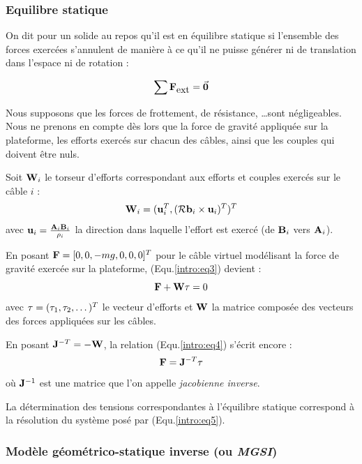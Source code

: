 \subsubsection{Equilibre statique}

On dit pour un solide au repos qu'il est en équilibre statique si l'ensemble des forces exercées s'annulent de manière à ce qu'il ne puisse générer ni de translation dans l'espace ni de rotation :

\begin{equation}
\sum \mathcal {\bf F}_{\hbox{ext}} = \vec {\bf 0}
\label{intro:eq2}
\end{equation}

Nous supposons que les forces de frottement, de résistance, \dots sont négligeables. Nous ne prenons en compte dès lors que la force de gravité appliquée sur la plateforme, les efforts exercés sur chacun des câbles, ainsi que les couples qui doivent être nuls.

Soit ${\bf W}_i$ le torseur d'efforts correspondant aux efforts et couples exercés sur le câble $i$ :
\begin{equation}
{\bf W}_i = ({\bf u}_i^T, (\mathcal R {\bf b}_i \times {\bf u}_i)^T)^T
\label{intro:eq3}
\end{equation}
avec ${\bf u}_i = \frac{{\bf A}_i{\bf B}_i}{\rho_i}$ la direction dans laquelle l'effort est exercé (de ${\bf B}_i$ vers ${\bf A}_i$).

En posant $\mathcal {\bf F} = [0, 0, -mg, 0, 0, 0]^T$ pour le câble virtuel modélisant la force de gravité exercée sur la plateforme, (Equ.\ref{intro:eq3}) devient :
\begin{equation}
\mathcal {\bf F} + {\bf W} {\bf \tau} = 0
\label{intro:eq4}
\end{equation}
avec ${\bf \tau} = (\tau_1, \tau_2, \dots)^T$ le vecteur d'efforts et ${\bf W}$ la matrice composée des vecteurs des forces appliquées sur les câbles.

En posant ${\bf J}^{-T} = - {\bf W}$, la relation (Equ.\ref{intro:eq4}) s'écrit encore :
\begin{equation}
\mathcal {\bf F} = {\bf J}^{-T} {\bf \tau}
\label{intro:eq5}
\end{equation}
où ${\bf J}^{-1}$ est une matrice que l'on appelle {\it jacobienne inverse}.

La détermination des tensions correspondantes à l'équilibre statique correspond à la résolution du système posé par (Equ.\ref{intro:eq5}).

\subsubsection{Modèle géométrico-statique inverse (ou {\it MGSI})}

